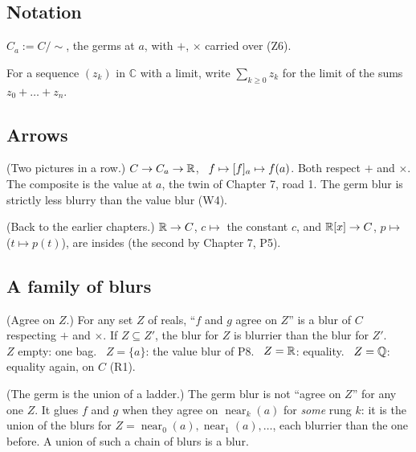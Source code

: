 \subsection*{Notation}

\begin{lines}
\item[\lab{N1}] $C_a := C/{\sim}$, the germs at $a$, with $+$, $\times$ carried over (Z6).
\item[\lab{N2}] For a sequence $(z_k)$ in $\mathbb{C}$ with a limit, write $\sum_{k \ge 0} z_k$ for the limit of the sums $z_0 + \dots + z_n$.
\end{lines}

\subsection*{Arrows}

\begin{lines}
\item[\lab{P8}] (Two pictures in a row.) $C \to C_a \to \mathbb{R}$, \ $f \mapsto [f]_a \mapsto f(a)$. Both respect $+$ and $\times$. The composite is the value at $a$, the twin of Chapter 7, road 1. The germ blur is strictly less blurry than the value blur (W4).
\item[\lab{P9}] (Back to the earlier chapters.) $\mathbb{R} \to C$, $c \mapsto$ the constant $c$, and $\mathbb{R}[x] \to C$, $p \mapsto$ ($t \mapsto p(t)$), are insides (the second by Chapter 7, P5).
\end{lines}

\subsection*{A family of blurs}

\begin{lines}
\item[\lab{P10}] (Agree on $Z$.) For any set $Z$ of reals, ``$f$ and $g$ agree on $Z$'' is a blur of $C$ respecting $+$ and $\times$. If $Z \subseteq Z'$, the blur for $Z$ is blurrier than the blur for $Z'$. \\
$Z$ empty: one bag. \ $Z = \{a\}$: the value blur of P8. \ $Z = \mathbb{R}$: equality. \ $Z = \mathbb{Q}$: equality again, on $C$ (R1).
\item[\lab{P11}] (The germ is the union of a ladder.) The germ blur is not ``agree on $Z$'' for any one $Z$. It glues $f$ and $g$ when they agree on $\operatorname{near}_k(a)$ for \emph{some} rung $k$: it is the union of the blurs for $Z = \operatorname{near}_0(a), \operatorname{near}_1(a), \dots$, each blurrier than the one before. A union of such a chain of blurs is a blur.
\end{lines}

